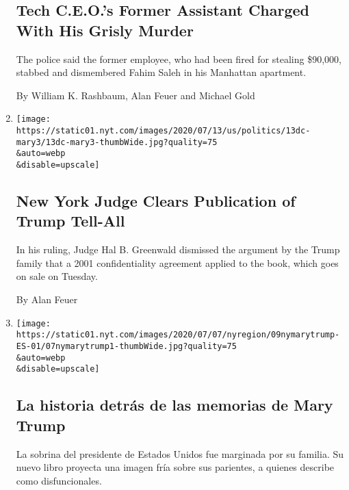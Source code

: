 \begin{enumerate}
  \hypertarget{tech-ceos-former-assistant-charged-with-his-grisly-murder}{%
  \subsection{Tech C.E.O.'s Former Assistant Charged With His Grisly
  Murder}\label{tech-ceos-former-assistant-charged-with-his-grisly-murder}}

  The police said the former employee, who had been fired for stealing
  \$90,000, stabbed and dismembered Fahim Saleh in his Manhattan
  apartment.

  By William K. Rashbaum, Alan Feuer and Michael Gold
\item
  \href{/2020/07/13/us/politics/mary-trump-book.html}{}

  \texttt{[image: https://static01.nyt.com/images/2020/07/13/us/politics/13dc-mary3/13dc-mary3-thumbWide.jpg?quality=75\\\&auto=webp\\\&disable=upscale]}

  \hypertarget{new-york-judge-clears-publication-of-trump-tell-all}{%
  \subsection{New York Judge Clears Publication of Trump
  Tell-All}\label{new-york-judge-clears-publication-of-trump-tell-all}}

  In his ruling, Judge Hal B. Greenwald dismissed the argument by the
  Trump family that a 2001 confidentiality agreement applied to the
  book, which goes on sale on Tuesday.

  By Alan Feuer
\item
  \href{/es/2020/07/09/espanol/mundo/libro-mary-trump-sobrina.html}{}

  \texttt{[image: https://static01.nyt.com/images/2020/07/07/nyregion/09nymarytrump-ES-01/07nymarytrump1-thumbWide.jpg?quality=75\\\&auto=webp\\\&disable=upscale]}

  \hypertarget{la-historia-detruxe1s-de-las-memorias-de-mary-trump}{%
  \subsection{La historia detrás de las memorias de Mary
  Trump}\label{la-historia-detruxe1s-de-las-memorias-de-mary-trump}}

  La sobrina del presidente de Estados Unidos fue marginada por su
  familia. Su nuevo libro proyecta una imagen fría sobre sus parientes,
  a quienes describe como disfuncionales.


\end{enumerate}
